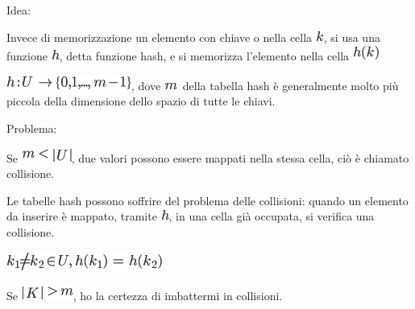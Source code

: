 \documentclass{article}
\begin{document}
{}

{Idea:}

{Invece di memorizzazione un elemento con chiave o nella cella
}\includegraphics{images/image118.png}{, si usa una funzione
}\includegraphics{images/image89.png}{, detta funzione hash, e si
memorizza l'elemento nella cella }\includegraphics{images/image233.png}

{}

\includegraphics{images/image234.png}{, dove
}\includegraphics{images/image235.png}{~della tabella hash è
generalmente molto più piccola della dimensione dello spazio di tutte le
chiavi.}

{}

{Problema: }

{Se }\includegraphics{images/image236.png}{, due valori possono essere
mappati nella stessa cella, ciò è chiamato collisione. }

{}

{Le tabelle hash possono soffrire del problema delle collisioni: quando
un elemento da inserire è mappato, tramite
}\includegraphics{images/image89.png}{, in una cella già occupata, si
verifica una collisione.}

\includegraphics{images/image237.png}

{}

{Se }\includegraphics{images/image238.png}{, ho la certezza di
imbattermi in collisioni.}

{}
\end{document}
